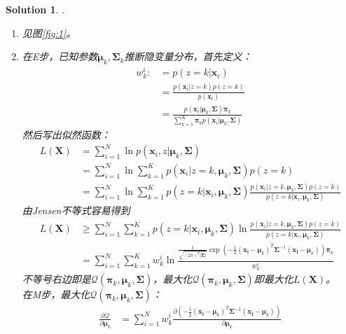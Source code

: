 \documentclass[a4paper,UTF8]{article}
\newtheorem*{solution}{Solution}
\numberwithin{equation}{section}
\begin{document}
\begin{solution}.
\begin{enumerate}[$1.$]
	\item 见图\ref{fig:1}。
	\item 在E步，已知参数$\boldsymbol{\mu}_k,\boldsymbol{\Sigma}_k$推断隐变量分布，首先定义：
	    \begin{align*}
		w_k^i:&= p(z=k|\boldsymbol{x}_i)\\&=\frac{p(\boldsymbol{x}_i|z=k)p(z=k)}{p(\boldsymbol{x}_i)}\\
			&=\frac{p(\boldsymbol{x}_i|\boldsymbol{\mu}_k,\boldsymbol{\Sigma})\boldsymbol{\pi}_k}{\sum_{k=1}^{K}\boldsymbol{\pi}_kp(\boldsymbol{x}_i|\boldsymbol{\mu}_k,\boldsymbol{\Sigma})}
		\end{align*}
	   然后写出似然函数：
	   \begin{align*}
	   	L(\boldsymbol{X})&=\sum_{i=1}^{N}\ln p(\boldsymbol{x}_i,z|\boldsymbol{\mu}_k,\boldsymbol{\Sigma})\\
	   	&=\sum_{i=1}^{N}\ln\sum_{k=1}^{K}p(\boldsymbol{x}_i|z=k,\boldsymbol{\mu}_k,\boldsymbol{\Sigma})p(z=k)\\
	   	&=\sum_{i=1}^{N}\ln\sum_{k=1}^{K}p(z=k|\boldsymbol{x}_i,\boldsymbol{\mu}_k,\boldsymbol{\Sigma})\frac{p(\boldsymbol{x}_i|z=k,\boldsymbol{\mu}_k,\boldsymbol{\Sigma})p(z=k)}{p(z=k|\boldsymbol{x}_i,\boldsymbol{\mu}_k,\boldsymbol{\Sigma})}
	   \end{align*}
       由Jensen不等式容易得到
       \begin{align*}
       	L(\boldsymbol{X})&\geq \sum_{i=1}^{N}\sum_{k=1}^{K}p(z=k|\boldsymbol{x}_i,\boldsymbol{\mu}_k,\boldsymbol{\Sigma})\ln\frac{p(\boldsymbol{x}_i|z=k,\boldsymbol{\mu}_k,\boldsymbol{\Sigma})p(z=k)}{p(z=k|\boldsymbol{x}_i,\boldsymbol{\mu}_k,\boldsymbol{\Sigma})}\\
       	&=\sum_{i=1}^{N}\sum_{k=1}^{K}w_k^i\ln\frac{\frac{1}{\sqrt{(2\pi)^d|\boldsymbol{\Sigma}|}}\exp(-\frac{1}{2}(\boldsymbol{x_i}-\boldsymbol{\mu}_k)^T\boldsymbol{\Sigma}^{-1}(\boldsymbol{x_i}-\boldsymbol{\mu}_k))\boldsymbol{\pi}_k}{w_k^i}
       \end{align*}
       不等号右边即是$\mathcal{Q}(\boldsymbol{\pi}_k,\boldsymbol{\mu}_k,\boldsymbol{\Sigma})$，最大化$\mathcal{Q}(\boldsymbol{\pi}_k,\boldsymbol{\mu}_k,\boldsymbol{\Sigma})$即最大化$L(\boldsymbol{X})$。\\
       在M步，最大化$\mathcal{Q}(\boldsymbol{\pi}_k,\boldsymbol{\mu}_k,\boldsymbol{\Sigma})$：
       \begin{align*}
       	\frac{\partial \mathcal{Q}}{\partial\boldsymbol{\mu}_k}&=\sum_{i=1}^{N}w_k^i\frac{\partial(-\frac{1}{2}(\boldsymbol{x_i}-\boldsymbol{\mu}_k)^T\boldsymbol{\Sigma}^{-1}(\boldsymbol{x_i}-\boldsymbol{\mu}_k))}{\partial\boldsymbol{\mu}_k}\\

\end{align*}
\end{enumerate}
\end{solution}
\end{document}
